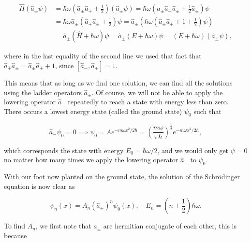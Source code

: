 \documentclass[a4paper,12pt]{report}
\begin{document}
\begin{equation}
  \begin{aligned} 
    \hat{H} (\hat{a} _{\pm } \psi ) &= \hbar \omega \left( \hat{a} _{\pm }\hat{a} _{\mp} +\frac{1}{2}    \right) (\hat{a} _{\pm }\psi ) = \hbar \omega \left( \hat{a} _{\pm }\hat{a} _{\mp}\hat{a} _{\pm } + \frac{1}{2} \hat{a} _{\pm } \right) \psi \\ &= \hbar \omega \hat{a} _{\pm }\left( \hat{a} _{\mp}\hat{a} _{\pm } + \frac{1}{2}    \right) \psi = \hat{a} _{\pm } \left( \hbar \omega \left( \hat{a} _{\pm }\hat{a} _{\mp} + 1 + \frac{1}{2}    \right) \psi \right) \\ &= \hat{a} _{\pm } (\hat{H} + \hbar \omega )\psi = \hat{a} _{\pm }(E+\hbar \omega )\psi = (E+\hbar \omega )(\hat{a} _{\pm }\psi  ),
  \end{aligned} 
\end{equation}

where in the last equality of the second line we used that fact that \(\hat{a} _{\mp} \hat{a} _{\pm } = \hat{a} _{\pm } \hat{a} _{\mp} + 1\), since \([\hat{a} _{-}, \hat{a} _{+}  ] = 1\).  

This means that as long as we find one solution, we can find all the solutions using the ladder operators \(\hat{a} _{\pm } \). Of course, we will not be able to apply the lowering operator \(\hat{a} _{-} \) repeatedly to reach a state with energy less than zero. There occurs a lowest energy state (called the ground state) \(\psi _{0} \) such that 

\begin{equation}
  \hat{a} _{-}\psi _{0} = 0 \implies \psi _{0} = Ae^{-m \omega x^2/2\hbar  } = \left( \frac{m \omega }{\pi \hbar }  \right)^{\frac{1}{4} } e^{-m \omega x^2/2 \hbar },
\end{equation}

which corresponds the state with energy \( E_{0} = \hbar \omega /2  \), and we would only get \(\psi =0\)  no matter how many times we apply the lowering operator \(\hat{a} _{-} \) to \(\psi _{0} \).

With our foot now planted on the ground state, the solution of the Schrödinger equation is now clear as

\begin{equation}
  \psi _{n}(x) = A_{n} (\hat{a} _{+} )^{n} \psi _{0}(x), \quad E_{n} = \left( n+\frac{1}{2}  \right)\hbar \omega . \label{Agen2} 
\end{equation}

To find \(A_{n} \), we first note that \(\hat{a} _{\pm } \) are hermitian conjugate of each other, this is because
\end{document}
